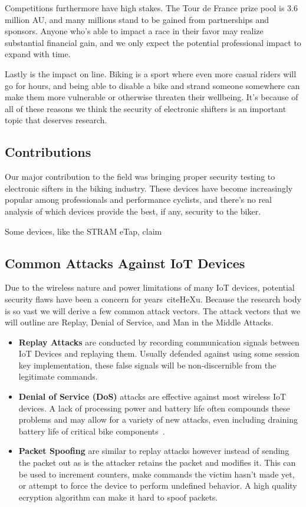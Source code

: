 \documentclass[letterpaper,twocolumn,10pt]{article}
\begin{document}
Competitions furthermore have high stakes. The Tour de France prize pool is 3.6 million AU, and many millions stand to be gained from partnerships and sponsors. Anyone who's able to impact a race in their favor may realize substantial financial gain, and we only expect the potential professional impact to expand with time.

Lastly is the impact on line. Biking is a sport where even more casual riders will go for hours, and being able to disable a bike and strand someone somewhere can make them more vulnerable or otherwise threaten their wellbeing. It's because of all of these reasons we think the security of electronic shifters is an important topic that deserves research.

\subsection{Contributions}

Our major contribution to the field was bringing proper security testing to electronic sifters in the biking industry. These devices have become increasingly popular among professionals and performance cyclists, and there's no real analysis of which devices provide the best, if any, security to the biker.

Some devices, like the STRAM eTap, claim

\subsection{Common Attacks Against IoT Devices}

Due to the wireless nature and power limitations of many IoT devices, potential security flaws have been a concern for years~cite{HeXu}. Because the research body is so vast we will derive a few common attack vectors. The attack vectors that we will outline are Replay, Denial of Service, and Man in the Middle Attacks.

\begin{itemize}
  \item \textbf{Replay Attacks} are conducted by recording communication signals between IoT Devices and replaying them. Usually defended against using some session key implementation, these false signals will be non-discernible from the legitimate commands.
  \item \textbf{Denial of Service (DoS)} attacks are effective against most wireless IoT devices. A lack of processing power and battery life often compounds these problems and may allow for a variety of new attacks, even including draining battery life of critical bike components~\cite{Moyers}.
  \item \textbf{Packet Spoofing} are similar to replay attacks however instead of sending the packet out as is the attacker retains the packet and modifies it. This can be used to increment counters, make commands the victim hasn't made yet, or attempt to force the device to perform undefined behavior. A high quality ecryption algorithm can make it hard to spoof packets.
\end{itemize}
\end{document}
